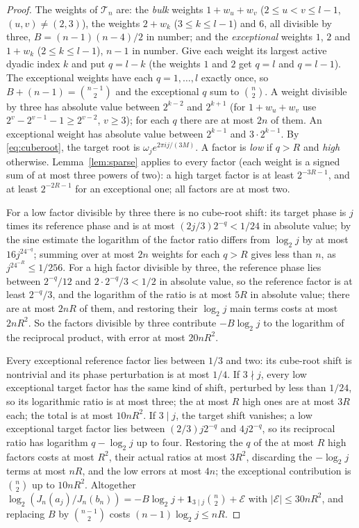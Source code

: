 \begin{proof}
The weights of $\mathcal T_n$ are: the \emph{bulk} weights $1+w_u+w_v$
($2\le u<v\le l-1$, $(u,v)\ne(2,3)$), the weights $2+w_k$ ($3\le k\le l-1$) and
$6$, all divisible by three, $B=(n-1)(n-4)/2$ in number; and the
\emph{exceptional} weights $1$, $2$ and $1+w_k$ ($2\le k\le l-1$), $n-1$ in
number. Give each weight its largest active dyadic index $k$ and put $q=l-k$
(the weights $1$ and $2$ get $q=l$ and $q=l-1$). The exceptional weights have
each $q=1,\dots,l$ exactly once, so $B+(n-1)=\binom{n-1}2$ and the exceptional
$q$ sum to $\binom n2$. A weight divisible by three has absolute value between
$2^{k-2}$ and $2^{k+1}$ (for $1+w_u+w_v$ use $2^v-2^{v-1}-1\ge2^{v-2}$, $v\ge3$);
for each $q$ there are at most $2n$ of them. An exceptional weight has absolute
value between $2^{k-1}$ and $3\cdot2^{k-1}$. By \eqref{eq:cuberoot}, the target
root is $\omega_je^{2\pi ij/(3M)}$. A factor is \emph{low} if $q>R$ and
\emph{high} otherwise. Lemma~\ref{lem:sparse} applies to every factor (each
weight is a signed sum of at most three powers of two): a high target factor is
at least $2^{-3R-1}$, and at least $2^{-2R-1}$ for an exceptional one; all
factors are at most two.

For a low factor divisible by three there is no cube-root shift: its target
phase is $j$ times its reference phase and is at most $(2j/3)2^{-q}<1/24$ in
absolute value; by the sine estimate the logarithm of the factor ratio differs
from $\log_2j$ by at most $16j^24^{-q}$; summing over at most $2n$ weights for
each $q>R$ gives less than $n$, as $j^24^{-R}\le1/256$. For a high factor
divisible by three, the reference phase lies between $2^{-q}/12$ and
$2\cdot2^{-q}/3<1/2$ in absolute value, so the reference factor is at least
$2^{-q}/3$, and the logarithm of the ratio is at most $5R$ in absolute value;
there are at most $2nR$ of them, and restoring their $\log_2j$ main terms costs
at most $2nR^2$. So the factors divisible by three contribute $-B\log_2j$ to the
logarithm of the reciprocal product, with error at most $20nR^2$.

Every exceptional reference factor lies between $1/3$ and two: its cube-root
shift is nontrivial and its phase perturbation is at most $1/4$. If $3\nmid j$,
every low exceptional target factor has the same kind of shift, perturbed by
less than $1/24$, so its logarithmic ratio is at most three; the at most $R$
high ones are at most $3R$ each; the total is at most $10nR^2$. If $3\mid j$,
the target shift vanishes; a low exceptional target factor lies between
$(2/3)j2^{-q}$ and $4j2^{-q}$, so its reciprocal ratio has logarithm $q-\log_2j$
up to four. Restoring the $q$ of the at most $R$ high factors costs at most
$R^2$, their actual ratios at most $3R^2$, discarding the $-\log_2j$ terms at
most $nR$, and the low errors at most $4n$; the exceptional contribution is
$\binom n2$ up to $10nR^2$. Altogether
$\log_2(J_n(a_j)/J_n(b_n))=-B\log_2j+\mathbf1_{3\mid j}\binom n2+\mathcal E$ with
$|\mathcal E|\le30nR^2$, and replacing $B$ by $\binom{n-1}2$ costs
$(n-1)\log_2j\le nR$.


\end{proof}
